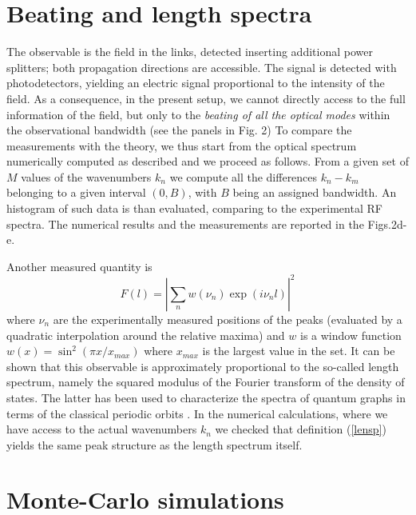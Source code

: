 \documentclass[aps,prl,twocolumn,showpacs,amsmath,amssymb,floatfix,superscriptaddress,
]{revtex4-1}
\begin{document}
\section{Beating and length spectra}
 
The observable is the field in the links, detected inserting additional power splitters; both propagation directions are accessible. The signal is detected with photodetectors, yielding an electric signal proportional to the intensity of the field. As a consequence,  in the present setup, we cannot directly access to the full information of the field, but only to the 
\textit{beating of all the optical modes} within the observational bandwidth (see the panels in Fig. 2)
To compare the measurements with the theory, we thus start from the optical spectrum numerically computed as described and we proceed as follows. 
From a given set of $M$ values of the wavenumbers $k_n$ we 
compute all the differences $k_n-k_m$ belonging to a given interval $(0,B)$, with $B$
being an assigned bandwidth. An histogram of such data is than evaluated, comparing to the experimental RF spectra. The numerical results and the measurements are reported in the 
Figs.2d-e.

Another measured quantity is 
\begin{equation}
F(l) = |\sum_n w(\nu_n) \exp(i\nu_n l)|^2
\label{lensp}
\end{equation}
where $\nu_n$ are the experimentally measured positions of the peaks (evaluated by a quadratic interpolation around the relative maxima) and $w$ is a window function $w(x)=\sin^2(\pi x/x_{max})$ where $x_{max}$ is the largest value in the set.
It can be shown that this observable is approximately proportional to the so-called length spectrum, namely the squared modulus  of the Fourier transform of the 
density of states. The latter has been used to characterize the 
spectra of quantum graphs in terms of the classical periodic orbits 
\citep{kottos2003quantum}. In the numerical calculations, where we have access
to the actual wavenumbers $k_n$ we checked that definition (\ref{lensp}) yields
the same peak structure as the length spectrum itself.   


\section{Monte-Carlo simulations}
 
\end{document}
